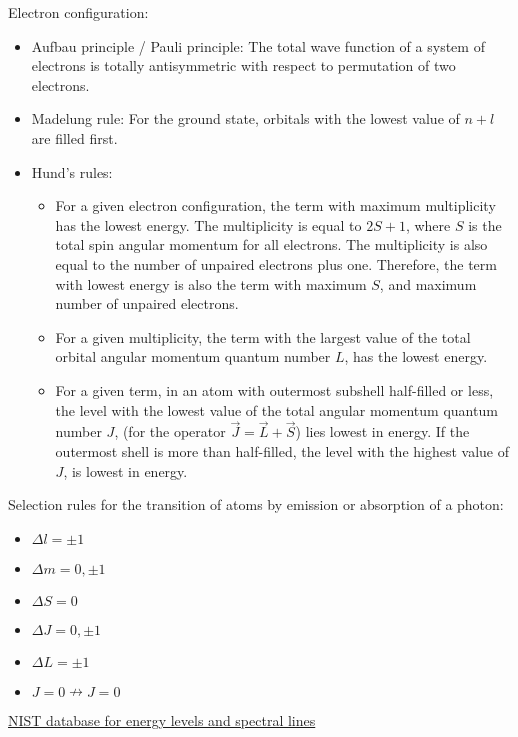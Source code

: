 			\noindent
			Electron configuration:
			\begin{itemize}
				\item Aufbau principle / Pauli principle: The total wave function of a system of electrons is totally antisymmetric with respect to permutation of two electrons.
				\item Madelung rule: For the ground state, orbitals with the lowest value of $n+l$ are filled first.
				\item Hund's rules:
				\begin{itemize}
					\item For a given electron configuration, the term with maximum multiplicity has the lowest energy. The multiplicity is equal to $2S+1$, where $S$ is the total spin angular momentum for all electrons. The multiplicity is also equal to the number of unpaired electrons plus one. Therefore, the term with lowest energy is also the term with maximum $S$, and maximum number of unpaired electrons.
					\item For a given multiplicity, the term with the largest value of the total orbital angular momentum quantum number  $L$, has the lowest energy.
					\item For a given term, in an atom with outermost subshell half-filled or less, the level with the lowest value of the total angular momentum quantum number  $J$, (for the operator $\vec{J} = \vec{L} + \vec{S}$) lies lowest in energy. If the outermost shell is more than half-filled, the level with the highest value of  $J$, is lowest in energy.
				\end{itemize}
			\end{itemize}

			\noindent
			Selection rules for the transition of atoms by emission or absorption of a photon:
			\begin{itemize}
				\item $\Delta l = \pm 1$
				\item $\Delta m = 0, \pm 1$
				\item $\Delta S = 0$
				\item $\Delta J = 0, \pm 1$
				\item $\Delta L = \pm 1$
				\item $J=0 \nrightarrow J=0$
			\end{itemize}

			\noindent
			\href{https://www.nist.gov/pml/atomic-spectra-database}{NIST database for energy levels and spectral lines}

